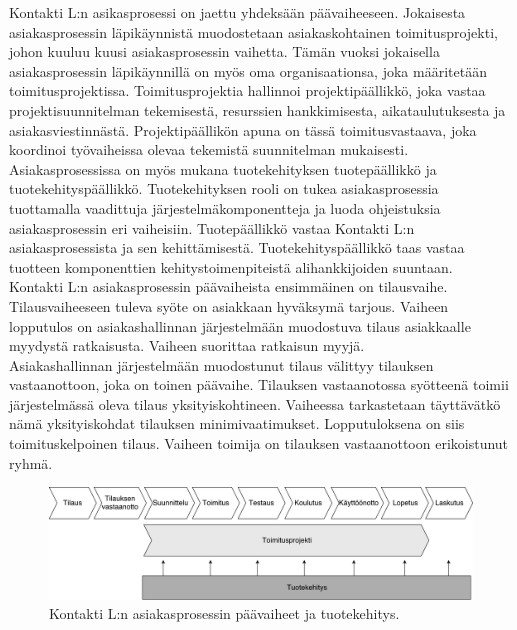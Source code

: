 \documentclass[finnish,12pt,a4paper,pdftex]{article}
\begin{document}
Kontakti L:n asikasprosessi on jaettu yhdeksään päävaiheeseen. Jokaisesta asiakasprosessin läpikäynnistä muodostetaan asiakaskohtainen toimitusprojekti, johon kuuluu kuusi  asiakasprosessin vaihetta. Tämän vuoksi jokaisella asiakasprosessin läpikäynnillä on myös oma organisaationsa, joka määritetään toimitusprojektissa. Toimitusprojektia hallinnoi projektipäällikkö, joka vastaa projektisuunnitelman tekemisestä, resurssien hankkimisesta, aikataulutuksesta ja asiakasviestinnästä. Projektipäällikön apuna on tässä toimitusvastaava, joka koordinoi työvaiheissa olevaa tekemistä suunnitelman mukaisesti.\\

Asiakasprosessissa on myös mukana tuotekehityksen tuotepäällikkö ja tuotekehityspäällikkö. Tuotekehityksen rooli on tukea asiakasprosessia tuottamalla vaadittuja järjestelmäkomponentteja ja luoda ohjeistuksia asiakasprosessin eri vaiheisiin. Tuotepäällikkö vastaa Kontakti L:n asiakasprosessista ja sen kehittämisestä. Tuotekehityspäällikkö taas vastaa tuotteen komponenttien kehitystoimenpiteistä alihankkijoiden suuntaan.\\

Kontakti L:n asiakasprosessin päävaiheista ensimmäinen on tilausvaihe. Tilausvaiheeseen tuleva syöte on asiakkaan hyväksymä tarjous. Vaiheen lopputulos on asiakashallinnan järjestelmään muodostuva tilaus asiakkaalle myydystä ratkaisusta. Vaiheen suorittaa ratkaisun myyjä.\\

Asiakashallinnan järjestelmään muodostunut tilaus välittyy tilauksen vastaanottoon, joka on toinen päävaihe. Tilauksen vastaanotossa syötteenä toimii järjestelmässä oleva tilaus yksityiskohtineen. Vaiheessa tarkastetaan täyttävätkö nämä yksityiskohdat tilauksen minimivaatimukset. Lopputuloksena on siis toimituskelpoinen tilaus. Vaiheen toimija on tilauksen vastaanottoon erikoistunut ryhmä.\\

\begin{figure}[!h]
    \centering
    \includegraphics[scale=0.4]{images/ODI-prosessi.pdf}
    \caption{Kontakti L:n asiakasprosessin päävaiheet ja tuotekehitys.}
    \label{fig:paavaih}
\end{figure}
\end{document}
